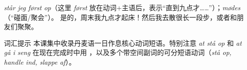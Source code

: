 {\textit{står jeg først op}（这里 \textit{først} 放在动词+主语后，表示“直到九点才……”）；\textit{mødes} （“碰面/聚会”）。}
{是的，周末我九点才起床！然后我去散很长一段步，或者和朋友们聚聚。}


\begin{tipbox}{词汇提示}
本课集中收录丹麦语一日作息核心动词短语。特别注意 \textit{at stå op} 和 \textit{at gå i seng} 在现在完成时中用 ，以及多个带空间副词的可分短语动词（\textit{stå op, handle ind, slappe af}）。
\end{tipbox}

